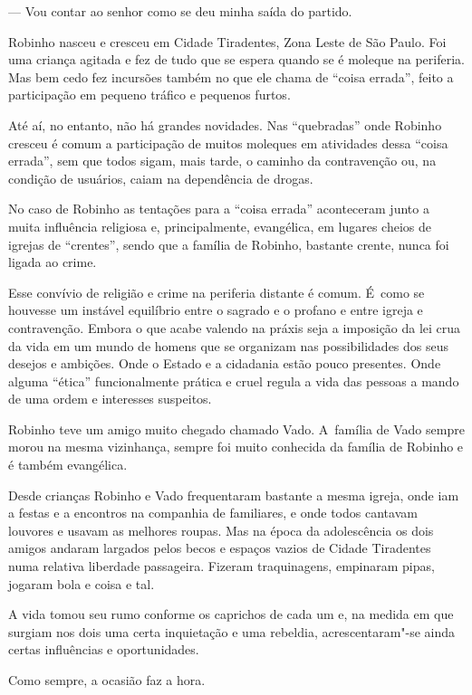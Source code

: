 — Vou contar ao senhor como se deu minha saída do partido.

\asterisc{}

Robinho nasceu e cresceu em Cidade Tiradentes, Zona Leste de São Paulo.
Foi uma criança agitada e fez de tudo que se espera quando se é moleque
na periferia. Mas bem cedo fez incursões também no que ele chama de
``coisa errada'', feito a participação em pequeno tráfico e pequenos
furtos.

Até aí, no entanto, não há grandes novidades. Nas ``quebradas'' onde
Robinho cresceu é comum a participação de muitos moleques em atividades
dessa ``coisa errada'', sem que todos sigam, mais tarde, o caminho da
contravenção ou, na condição de usuários, caiam na dependência de
drogas.

No caso de Robinho as tentações para a ``coisa errada'' aconteceram
junto a muita influência religiosa e, principalmente, evangélica, em
lugares cheios de igrejas de ``crentes'', sendo que a família de
Robinho, bastante crente, nunca foi ligada ao crime.

Esse convívio de religião e crime na periferia distante é comum. É~como
se houvesse um instável equilíbrio entre o sagrado e o profano e entre
igreja e contravenção. Embora o que acabe valendo na práxis seja
a imposição da lei crua da vida em um mundo de homens que se organizam
nas possibilidades dos seus desejos e ambições. Onde o Estado e a
cidadania estão pouco presentes. Onde alguma ``ética'' funcionalmente
prática e cruel regula a vida das pessoas a mando de uma ordem e
interesses suspeitos.

\asterisc{}

Robinho teve um amigo muito chegado chamado Vado. A~família de Vado
sempre morou na mesma vizinhança, sempre foi muito conhecida da família
de Robinho e é também evangélica.

Desde crianças Robinho e Vado frequentaram bastante a mesma igreja,
onde iam a festas e a encontros na companhia de familiares, e onde todos
cantavam louvores e usavam as melhores roupas. Mas na época da
adolescência os dois amigos andaram largados pelos becos e espaços
vazios de Cidade Tiradentes numa relativa liberdade passageira. Fizeram
traquinagens, empinaram pipas, jogaram bola e coisa e tal.

A vida tomou seu rumo conforme os caprichos de cada um e, na medida em
que surgiam nos dois uma certa inquietação e uma rebeldia,
acrescentaram"-se ainda certas influências e oportunidades.

Como sempre, a ocasião faz a hora.

